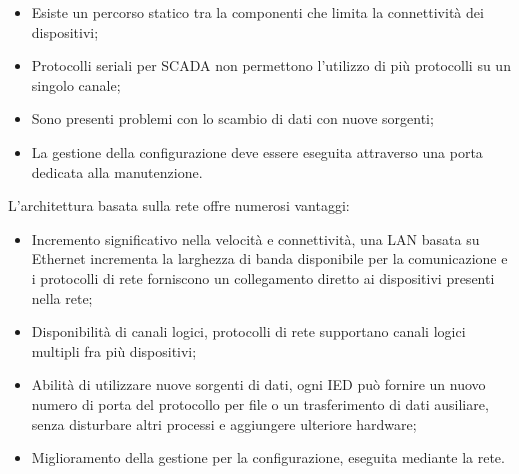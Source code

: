 \begin{itemize}
	\item Esiste un percorso statico tra la componenti che limita la connettività dei dispositivi;
	\item Protocolli seriali per SCADA non permettono l'utilizzo di più protocolli su un singolo canale;
	\item Sono presenti problemi con lo scambio di dati con nuove sorgenti;
	\item La gestione della configurazione deve essere eseguita attraverso una porta dedicata alla manutenzione.
\end{itemize}   
L'architettura basata sulla rete offre numerosi vantaggi:
\begin{itemize}
	\item Incremento significativo nella velocità e connettività, una LAN basata su Ethernet incrementa la larghezza di banda disponibile per la comunicazione e i protocolli di rete forniscono un collegamento diretto ai dispositivi presenti nella rete;
	\item Disponibilità di canali logici, protocolli di rete supportano canali logici multipli fra più dispositivi;
	\item Abilità di utilizzare nuove sorgenti di dati, ogni IED può fornire un nuovo numero di porta del protocollo per file o un trasferimento di dati ausiliare, senza disturbare altri processi e aggiungere ulteriore hardware;
	\item Miglioramento della gestione per la configurazione, eseguita mediante la rete.
\end{itemize}
